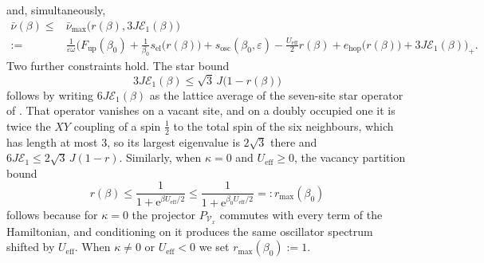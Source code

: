 \documentclass[11pt]{article}
\numberwithin{equation}{section}
\newcommand{\e}{\mathrm{e}}
\newcommand{\eff}{\mathrm{eff}}
\newcommand{\hop}{\mathrm{hop}}
\theoremstyle{definition}
\begin{document}
and, simultaneously,
\begin{equation}
\begin{aligned}
\bar\nu(\beta)\le{}&\bar\nu_{\max}\big(r(\beta),3J\mathcal{E}_{1}(\beta)\big)\\
:={}&\frac{1}{\varepsilon\omega}\Big(F_{\mathrm{up}}(\beta_0)+\frac{1}{\beta_0}s_{\mathrm{el}}\big(r(\beta)\big)+s_{\mathrm{osc}}(\beta_0,\varepsilon)
-\frac{U_{\eff}}{2}r(\beta)+e_{\hop}\big(r(\beta)\big)+3J\mathcal{E}_{1}(\beta)\Big)_{+}.
\end{aligned}
\label{eq:numax}
\end{equation}
Two further constraints hold. The star bound
\begin{equation}
3J\mathcal{E}_{1}(\beta)\le\sqrt3\,J\big(1-r(\beta)\big)
\label{eq:star}
\end{equation}
follows by writing $6J\mathcal{E}_{1}(\beta)$ as the lattice average of the seven-site star
operator of \cite{rens2026pkodlro}. That operator vanishes on a vacant site, and on a
doubly occupied one it is twice the $XY$ coupling of a spin $\frac12$ to the total spin
of the six neighbours, which has length at most $3$, so its largest eigenvalue is
$2\sqrt3$ there and $6J\mathcal{E}_{1}\le2\sqrt3\,J(1-r)$. Similarly, when $\kappa=0$ and
$U_{\eff}\ge0$, the vacancy partition bound
\begin{equation}
r(\beta)\le\frac{1}{1+\e^{\beta U_{\eff}/2}}\le\frac{1}{1+\e^{\beta_0U_{\eff}/2}}=:r_{\max}(\beta_0)
\label{eq:rmax}
\end{equation}
follows because for $\kappa=0$ the projector $P_{\mathcal{V}_{x}}$ commutes with every
term of the Hamiltonian, and conditioning on it produces the same oscillator spectrum
shifted by $U_{\eff}$. When $\kappa\ne0$ or $U_{\eff}<0$ we set $r_{\max}(\beta_0):=1$.
\end{document}
